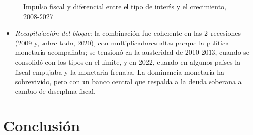 \documentclass[11pt]{article}
\begin{document}
\begin{figure}[H]
\centering
\caption{Impulso fiscal y diferencial entre el tipo de interés y el crecimiento, 2008-2027}\label{fig:impulso-fiscal-r-menos-g}
\end{figure}

\begin{itemize}
\item \emph{Recapitulación del bloque}: la combinación fue coherente en las 2~recesiones (2009 y, sobre todo, 2020), con multiplicadores altos porque la política monetaria acompañaba; se tensionó en la austeridad de 2010-2013, cuando se consolidó con los tipos en el límite, y en 2022, cuando en algunos países la fiscal empujaba y la monetaria frenaba. La dominancia monetaria ha sobrevivido, pero con un banco central que respalda a la deuda soberana a cambio de disciplina fiscal.
\end{itemize}

\section*{Conclusión}
\end{document}
